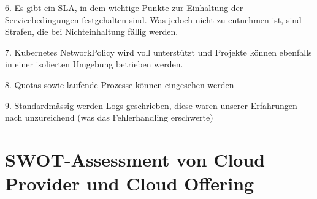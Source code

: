 \documentclass[12pt,a4paper]{article}
\begin{document}
6. Es gibt ein SLA, in dem wichtige Punkte zur Einhaltung der Servicebedingungen festgehalten sind. Was jedoch nicht zu entnehmen ist, sind Strafen, die bei Nichteinhaltung fällig werden.

7. Kubernetes NetworkPolicy wird voll unterstützt und Projekte können ebenfalls in einer isolierten Umgebung betrieben werden.

8. Quotas sowie laufende Prozesse können eingesehen werden

9. Standardmässig werden Logs geschrieben, diese waren unserer Erfahrungen nach unzureichend (was das Fehlerhandling erschwerte)

\section{SWOT-Assessment von Cloud Provider und Cloud Offering}
\end{document}

